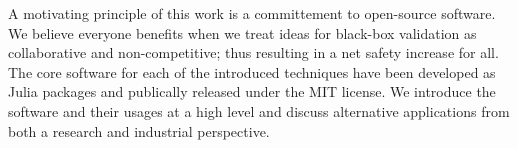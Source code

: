 A motivating principle of this work is a committement to open-source software.
We believe everyone benefits when we treat ideas for black-box validation as collaborative and non-competitive; thus resulting in a net safety increase for all.
The core software for each of the introduced techniques have been developed as Julia packages and publically released under the MIT license.
We introduce the software and their usages at a high level and discuss alternative applications from both a research and industrial perspective.